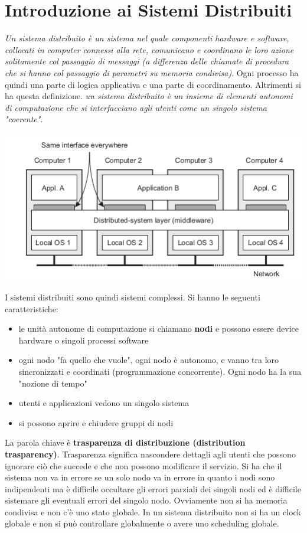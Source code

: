 \documentclass[a4paper,12pt, oneside]{book}
\begin{document}
\chapter{Introduzione ai Sistemi Distribuiti}
\textit{Un sistema distribuito è un sistema nel quale componenti hardware e software, collocati in computer connessi alla rete, comunicano e coordinano le loro azione solitamente col passaggio di messaggi (a differenza delle chiamate di procedura che si hanno col passaggio di parametri su memoria condivisa)}. Ogni processo ha quindi una parte di logica applicativa e una parte di coordinamento. Altrimenti si ha questa definizione. \textit{un sistema distribuito è un insieme di elementi autonomi di computazione che si interfacciano agli utenti come un singolo sistema "coerente"}.
\begin{center}
	\includegraphics[scale=2.5]{img/cli.png}
\end{center}
I sistemi distribuiti sono quindi sistemi complessi. Si hanno le seguenti caratteristiche:
\begin{itemize}
	\item le unità autonome di computazione si chiamano \textbf{nodi} e possono essere device hardware o singoli processi software
	\item ogni nodo "fa quello che vuole", ogni nodo è autonomo, e vanno tra loro sincronizzati e coordinati (programmazione concorrente). Ogni nodo ha la sua "nozione di tempo"
	\item utenti e applicazioni vedono un singolo sistema
	\item si possono aprire e chiudere gruppi di nodi
\end{itemize}
La parola chiave è \textbf{trasparenza di distribuzione (distribution trasparency)}. Trasparenza significa nascondere dettagli agli utenti che possono ignorare ciò che succede e che non possono modificare il servizio. Si ha che il sistema non va in errore se un solo nodo va in errore in quanto i nodi sono indipendenti ma è difficile occultare gli errori parziali dei singoli nodi ed è difficile sistemare gli eventuali errori del singolo nodo. Ovviamente non si ha memoria condivisa e non c'è uno stato globale. In un sistema distribuito non si ha un clock globale e non si può controllare globalmente o avere uno scheduling globale.
\end{document}
